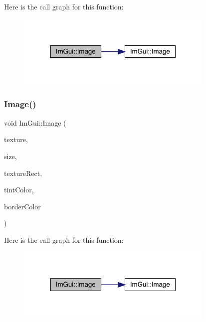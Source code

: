 Here is the call graph for this function\+:
\nopagebreak
\begin{figure}[H]
\begin{center}
\leavevmode
\includegraphics[width=268pt]{df/d13/namespace_im_gui_a38a669345d55f897af0964def4acdc07_cgraph}
\end{center}
\end{figure}
\mbox{\label{namespace_im_gui_a5a7a802b1e04f9fb07d7224b685f604e}} 
\subsubsection{\texorpdfstring{Image()}{Image()}\hspace{0.1cm}{\footnotesize\ttfamily [4/6]}}
{\footnotesize\ttfamily void Im\+Gui\+::\+Image (\begin{DoxyParamCaption}\item[{const sf\+::\+Texture \&}]{texture,  }\item[{const sf\+::\+Vector2f \&}]{size,  }\item[{const sf\+::\+Float\+Rect \&}]{texture\+Rect,  }\item[{const sf\+::\+Color \&}]{tint\+Color,  }\item[{const sf\+::\+Color \&}]{border\+Color }\end{DoxyParamCaption})}

Here is the call graph for this function\+:
\nopagebreak
\begin{figure}[H]
\begin{center}
\leavevmode
\includegraphics[width=268pt]{df/d13/namespace_im_gui_a5a7a802b1e04f9fb07d7224b685f604e_cgraph}
\end{center}
\end{figure}
\mbox{\label{namespace_im_gui_a12ec1591629f9e4d845ca63501e3d577}} 
